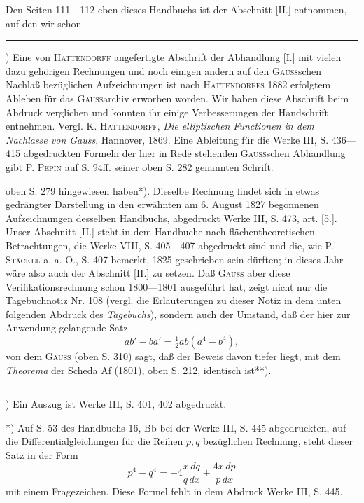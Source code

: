 \par\indent Den Seiten 111---112 eben dieses Handbuchs ist der Abschnitt [II.] entnommen, auf den wir schon
\par{}\bigskip\noindent\rule{.25\linewidth}{.4pt}\par\smallskip
{\small\par\indent *) Eine von \textsc{Hattendorff} angefertigte  Abschrift der Abhandlung [I.] \linebreak mit vielen dazu gehörigen Rechnungen und noch einigen andern auf den \textsc{Gauss}schen Nachlaß bezüglichen Aufzeichnungen ist nach \textsc{Hattendorffs} 1882 erfolgtem Ableben für das \textsc{Gauss}archiv erworben worden. Wir haben diese Abschrift beim Abdruck verglichen und konnten ihr einige Verbesserungen der Handschrift entnehmen. Vergl. K. \textsc{Hattendorff}, \textit{Die elliptischen Functionen in dem Nachlasse von Gauss}, Hannover, 1869. Eine Ableitung für die Werke III, S. 436---415 abgedruckten Formeln der hier in Rede stehenden \textsc{Gauss}schen Abhandlung gibt P. \textsc{Pepin} auf S. 94ff. seiner oben S. 282 genannten Schrift.\par}
\clearpage{}
\noindent oben S. 279 hingewiesen haben*). Dieselbe Rechnung findet sich in etwas gedrängter Darstellung in den erwähnten am 6. August 1827 begonnenen Aufzeichnungen desselben Handbuchs, abgedruckt Werke III, S. 473, art. [5.]. Unser Abschnitt [II.] steht in dem Handbuche nach flächentheoretischen Betrachtungen, die Werke VIII, S. 405---407 abgedruckt sind und die, wie P. \textsc{Stäckel} a. a. O., S. 407 bemerkt, 1825 geschrieben sein dürften; in dieses Jahr wäre also auch der Abschnitt [II.] zu setzen. Daß \textsc{Gauss} aber diese Verifikationsrechnung schon 1800---1801 ausgeführt hat, zeigt nicht nur die Tagebuchnotiz Nr. 108 (vergl. die Erläuterungen zu dieser Notiz in dem unten folgenden Abdruck des \textit{Tagebuchs}), sondern auch der Umstand, daß der hier zur Anwendung gelangende Satz
\[ab'-ba'=\tfrac12ab(a^4-b^4),\]
\noindent von dem \textsc{Gauss} (oben S. 310) sagt, daß der Beweis davon tiefer liegt, mit dem \textit{Theorema} der Scheda Af (1801), oben S. 212, identisch ist**).
\par\bigskip\noindent\rule{.25\linewidth}{.4pt}\par\smallskip
{\small\par\indent *) Ein Auszug ist Werke III, S. 401, 402 abgedruckt.
\par\indent **) Auf S. 53 des Handbuchs 16, Bb bei der Werke III, S. 445 abgedruckten, auf die Differentialgleichungen für die Reihen $p,q$ bezüglichen Rechnung, steht dieser Satz in der Form
\[p^4-q^4=-4\frac{x\,dq}{q\,dx}+\frac{4x\,dp}{p\,dx}\]
\noindent mit einem Fragezeichen. Diese Formel fehlt in dem Abdruck Werke III, S. 445.\par}
\clearpage
\endgroup
